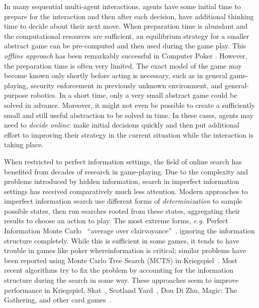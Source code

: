 \documentclass[letterpaper]{article}
\newcommand{\eg}{{\it e.g.}\xspace}
\begin{document}
In many sequential multi-agent interactions, agents have some initial time to prepare for the interaction and then after each decision, have  additional thinking time to decide about their next move. When preparation time is abundant and the computational resources are sufficient, an equilibrium strategy for a smaller abstract game can be pre-computed and then used during the game play. This {\it offline approach} has been remarkably successful in Computer Poker \cite{Johanson07Msc}.
However, the preparation time is often very limited. The exact model of the game may become known only shortly before acting is necessary, such as in general game-playing, security enforcement in previously unknown environment, and general-purpose robotics. In a short time, only a very small abstract game could be solved in advance. Moreover, it might not even be possible to create a sufficiently small and still useful abstraction to be solved in time. In these cases, agents may need to {\it decide online}: make initial decisions quickly and then put additional effort to improving their strategy in the current situation while the interaction is taking place.

When restricted to perfect information settings, the field of online search has benefited from decades of research in game-playing. 
Due to the complexity and problems introduced by hidden information, search in imperfect information settings has received comparatively much less attention.
Modern approaches to imperfect information search use different forms of {\it determinization} to sample possible states, then run 
searches rooted from these states, aggregating their results to choose an action to play. The most extreme forms, \eg Perfect Information 
Monte Carlo~\cite{Long10Understanding} ``average over clairvoyance''~\cite{AIBook},
ignoring the information structure completely. While this is sufficient in some games, it tends to have trouble in games like poker 
whereinformation is critical; similar problems have been reported using Monte Carlo Tree Search (MCTS) in Kriegspiel~\cite{Ciancarini10Kriegspiel}.
Most recent algorithms try to fix the problem by accounting for the information structure during the 
search in some way. These approaches seem to improve performance in Kriegspiel, Skat~\cite{Furtak13Recursive}, 
Scotland Yard~\cite{Nijssen12SY}, Dou Di Zhu, Magic: The Gathering, and other card games~\cite{Cowling12MTG,Cowling12ISMCTS}.
\end{document}
